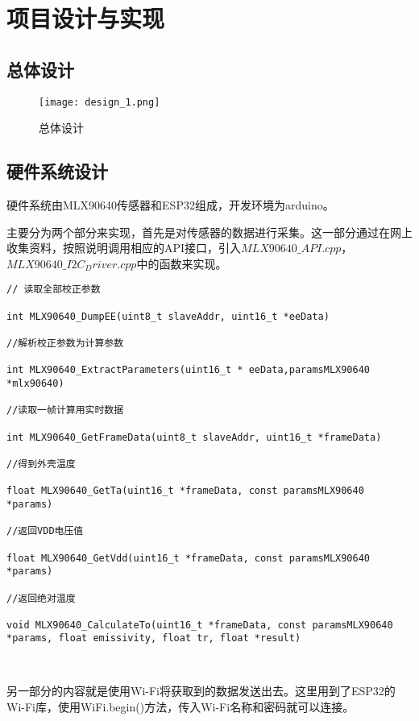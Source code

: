 \chapter{项目设计与实现}
\section{总体设计}
\begin{figure}[htbp]
    \centering
    \texttt{[image: design\_1.png]}
    \caption{总体设计}\label{fig:design_1}
    \vspace{\baselineskip}
    \end{figure}


\section{硬件系统设计}
硬件系统由MLX90640传感器和ESP32组成，开发环境为arduino。

主要分为两个部分来实现，首先是对传感器的数据进行采集。这一部分通过在网上收集资料，按照说明调用相应的API接口，引入$MLX90640\_API.cpp$，$MLX90640\_I2C_Driver.cpp$中的函数来实现。

\begin{lstlisting} 
// 读取全部校正参数
    
int MLX90640_DumpEE(uint8_t slaveAddr, uint16_t *eeData) 
    
//解析校正参数为计算参数
    
int MLX90640_ExtractParameters(uint16_t * eeData,paramsMLX90640 *mlx90640) 
    
//读取一帧计算用实时数据
    
int MLX90640_GetFrameData(uint8_t slaveAddr, uint16_t *frameData) 
    
//得到外壳温度
    
float MLX90640_GetTa(uint16_t *frameData, const paramsMLX90640 *params)
    
//返回VDD电压值
   
float MLX90640_GetVdd(uint16_t *frameData, const paramsMLX90640 *params)
    
//返回绝对温度
   
void MLX90640_CalculateTo(uint16_t *frameData, const paramsMLX90640 *params, float emissivity, float tr, float *result)
    
    
\end{lstlisting}

另一部分的内容就是使用Wi-Fi将获取到的数据发送出去。这里用到了ESP32的Wi-Fi库，使用WiFi.begin()方法，传入Wi-Fi名称和密码就可以连接。

